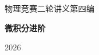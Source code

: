 \documentclass[11pt,openany,fontset=fandol]{ctexbook}
\begin{document}
\frontmatter
\begin{titlepage}
\centering\vspace*{30mm}
{\Large 物理竞赛二轮讲义\quad 第四编\par}\vspace{8mm}

{\Huge\bfseries 微积分进阶\par}
\vspace{12mm}{\Large 物理竞赛二轮讲义\par}
\vspace{10mm}{\large 第一讲至第四讲\par}
\vfill{\large 2026\par}
\end{titlepage}
\tableofcontents
\mainmatter




\end{document}
